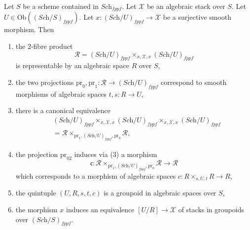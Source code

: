 \begin{lemma}
\label{lemma-space-presentation}
Let $S$ be a scheme contained in $\textit{Sch}_{fppf}$.
Let $\mathcal{X}$ be an algebraic stack over $S$.
Let $U \in \text{Ob}((\textit{Sch}/S)_{fppf})$.
Let $x : (\textit{Sch}/U)_{fppf} \to \mathcal{X}$ be a
surjective smooth morphism. Then
\begin{enumerate}
\item the $2$-fibre product
$$
\mathcal{R} =
(\textit{Sch}/U)_{fppf} \times_{x, \mathcal{X}, x} (\textit{Sch}/U)_{fppf}
$$
is representable by an algebraic space $R$ over $S$,
\item the two projections
$\text{pr}_0, \text{pr}_1 : \mathcal{R} \to (\textit{Sch}/U)_{fppf}$
correspond to smooth morphisms of algebraic spaces $t, s : R \to U$,
\item there is a canonical equivalence
\begin{align*}
&(\textit{Sch}/U)_{fppf} \times_{x, \mathcal{X}, x} (\textit{Sch}/U)_{fppf}
\times_{x, \mathcal{X}, x} (\textit{Sch}/U)_{fppf} \\
& =
\mathcal{R}
\times_{\text{pr}_1, (\textit{Sch}/U)_{fppf}, \text{pr}_0} \mathcal{R},
\end{align*}
\item the projection $\text{pr}_{02}$ induces via (3) a morphism
$$
\mathfrak c :
\mathcal{R}
\times_{\text{pr}_1, (\textit{Sch}/U)_{fppf}, \text{pr}_0} \mathcal{R}
\longrightarrow
\mathcal{R}
$$
which corresponds to a morphism of algebraic spaces
$c : R \times_{s, U, t} R \to R$,
\item the quintuple $(U, R, s, t, c)$ is a groupoid in algebraic spaces
over $S$,
\item the morphism $x$ induces an equivalence
$[U/R] \to \mathcal{X}$
of stacks in groupoids over $(\textit{Sch}/S)_{fppf}$.
\end{enumerate}
\end{lemma}

